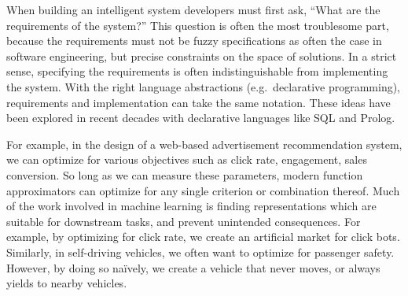 When building an intelligent system developers must first ask, ``What are the requirements of the system?'' This question is often the most troublesome part, because the requirements must not be fuzzy specifications as often the case in software engineering, but precise constraints on the space of solutions. In a strict sense, specifying the requirements is often indistinguishable from implementing the system. With the right language abstractions (e.g.\ declarative programming), requirements and implementation can take the same notation. These ideas have been explored in recent decades with declarative languages like SQL and Prolog.

For example, in the design of a web-based advertisement recommendation system, we can optimize for various objectives such as click rate, engagement, sales conversion. So long as we can measure these parameters, modern function approximators can optimize for any single criterion or combination thereof. Much of the work involved in machine learning is finding representations which are suitable for downstream tasks, and prevent unintended consequences. For example, by optimizing for click rate, we create an artificial market for click bots. Similarly, in self-driving vehicles, we often want to optimize for passenger safety. However, by doing so na\"ively, we create a vehicle that never moves, or always yields to nearby vehicles.

